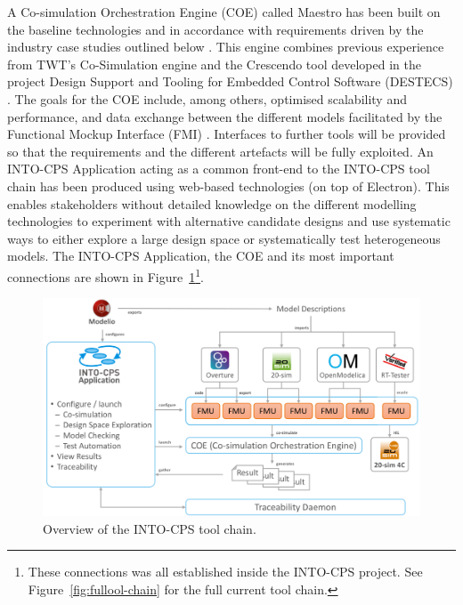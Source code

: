 A Co-simulation Orchestration Engine (COE) called Maestro has been built on the baseline technologies and in accordance with requirements driven by the industry case studies outlined below \cite{Thule&17}. This engine combines previous experience from TWT's Co-Simulation engine and the Crescendo tool developed in the project Design Support and Tooling for Embedded Control Software (DESTECS) \cite{Broenink&10}. The goals for the COE include, among others, optimised scalability and performance, and data exchange between the different models facilitated by the Functional Mockup Interface (FMI) \cite{FMIStandard2.0}. Interfaces to further tools will be provided so that the requirements and the different artefacts will be fully exploited. An INTO-CPS Application acting as a common front-end to the INTO-CPS tool chain has been produced using web-based technologies (on top of Electron). This enables stakeholders without detailed knowledge on the different modelling technologies to experiment with alternative candidate designs and use systematic ways to either explore a large design space or systematically test heterogeneous models. The INTO-CPS Application, the COE and its most important connections are shown in Figure~\ref{fig:toolchain}\footnote{These connections was all established inside the INTO-CPS project. See Figure~\ref{fig:fullool-chain} for the full current tool chain.}.

\begin{figure}[ht]
\centering
\includegraphics[width=\textwidth]{./figures/toolchain}
\caption{Overview of the INTO-CPS tool chain.}
\label{fig:toolchain}
\end{figure}

